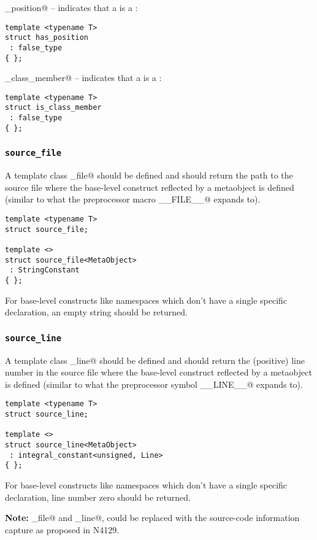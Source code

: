 \verb@has_position@ -- indicates that a  is a :
\begin{verbatim}
template <typename T>
struct has_position
 : false_type
{ };
\end{verbatim}

\verb@is_class_member@ -- indicates that a  is a :
\begin{verbatim}
template <typename T>
struct is_class_member
 : false_type
{ };
\end{verbatim}

\subsubsection{\texttt{source\_file}}

A template class \verb@source_file@ should be defined and should return the
path to the source file where the base-level construct reflected by a
metaobject is defined (similar to what the preprocessor macro \verb@__FILE__@
expands to).

\begin{verbatim}
template <typename T>
struct source_file;

template <>
struct source_file<MetaObject>
 : StringConstant
{ };
\end{verbatim}

For base-level constructs like namespaces which don't have a single specific
declaration, an empty string should be returned.

\subsubsection{\texttt{source\_line}}

A template class \verb@source_line@ should be defined and should return the (positive)
line number in the source file where the base-level construct reflected by a
metaobject is defined (similar to what the preprocessor symbol \verb@__LINE__@
expands to).

\begin{verbatim}
template <typename T>
struct source_line;

template <>
struct source_line<MetaObject>
 : integral_constant<unsigned, Line>
{ };
\end{verbatim}

For base-level constructs like namespaces which don't have a single specific
declaration, line number zero should be returned.

\textbf{Note:} \verb@source_file@ and \verb@source_line@, could be
replaced with the source-code information capture as proposed in N4129.

